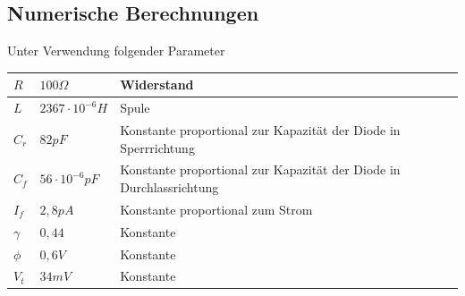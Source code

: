 \documentclass{scrartcl}
\begin{document}
\subsection{ Numerische Berechnungen } \label{ssec:num}
Unter Verwendung folgender Parameter
\begin{center}
    \begin{tabular}{ | l | l | p{5cm} |}
    \hline
    $R$ & $100\Omega$ & Widerstand \\ \hline
    $L$ & $2367\cdot10^{-6} H$ & Spule \\ \hline
    $C_r$ & $82 pF$ & Konstante proportional zur Kapazität der Diode in Sperrrichtung \\ \hline
    $C_f$ & $56 \cdot10^{-6}  pF$ & Konstante proportional zur Kapazität der Diode in Durchlassrichtung \\ \hline
    $I_f$ & $2,8pA$ & Konstante proportional zum Strom  \\ \hline
    $\gamma$ & $0,44$ & Konstante \\ \hline
    $\phi$ & $0,6V$ & Konstante \\ \hline
    $V_t$ & $34mV$ & Konstante \\
    \hline
    \end{tabular}
\end{center}
\end{document}
